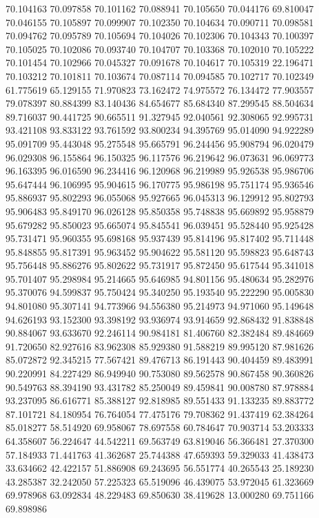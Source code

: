 70.104163
70.097858
70.101162
70.088941
70.105650
70.044176
69.810047
70.046155
70.105897
70.099907
70.102350
70.104634
70.090711
70.098581
70.094762
70.095789
70.105694
70.104026
70.102306
70.104343
70.100397
70.105025
70.102086
70.093740
70.104707
70.103368
70.102010
70.105222
70.101454
70.102966
70.045327
70.091678
70.104617
70.105319
22.196471
70.103212
70.101811
70.103674
70.087114
70.094585
70.102717
70.102349
61.775619
65.129155
71.970823
73.162472
74.975572
76.134472
77.903557
79.078397
80.884399
83.140436
84.654677
85.684340
87.299545
88.504634
89.716037
90.441725
90.665511
91.327945
92.040561
92.308065
92.995731
93.421108
93.833122
93.761592
93.800234
94.395769
95.014090
94.922289
95.091709
95.443048
95.275548
95.665791
96.244456
95.908794
96.020479
96.029308
96.155864
96.150325
96.117576
96.219642
96.073631
96.069773
96.163395
96.016590
96.234416
96.120968
96.219989
95.926538
95.986706
95.647444
96.106995
95.904615
96.170775
95.986198
95.751174
95.936546
95.886937
95.802293
96.055068
95.927665
96.045313
96.129912
95.802793
95.906483
95.849170
96.026128
95.850358
95.748838
95.669892
95.958879
95.679282
95.850023
95.665074
95.845541
96.039451
95.528440
95.925428
95.731471
95.960355
95.698168
95.937439
95.814196
95.817402
95.711448
95.848855
95.817391
95.963452
95.904622
95.581120
95.598823
95.648743
95.756448
95.886276
95.802622
95.731917
95.872450
95.617544
95.341018
95.701407
95.298984
95.214665
95.646985
94.801156
95.480634
95.282976
95.370076
94.599837
95.750424
95.340250
95.193540
95.222290
95.005830
94.801080
95.307141
94.773966
94.556380
95.214973
94.971060
95.149648
94.626193
93.152300
93.398192
93.936974
93.914659
92.868432
91.838848
90.884067
93.633670
92.246114
90.984181
81.406760
82.382484
89.484669
91.720650
82.927616
83.962308
85.929380
91.588219
89.995120
87.981626
85.072872
92.345215
77.567421
89.476713
86.191443
90.404459
89.483991
90.220991
84.227429
86.949940
90.753080
89.562578
90.867458
90.360826
90.549763
88.394190
93.431782
85.250049
89.459841
90.008780
87.978884
93.237095
86.616771
85.388127
92.818985
89.551433
91.133235
89.883772
87.101721
84.180954
76.764054
77.475176
79.708362
91.437419
62.384264
85.018277
58.514920
69.958067
78.697558
60.784647
70.903714
53.203333
64.358607
56.224647
44.542211
69.563749
63.819046
56.366481
27.370300
57.184933
71.441763
41.362687
25.744388
47.659393
59.329033
41.438473
33.634662
42.422157
51.886908
69.243695
56.551774
40.265543
25.189230
43.285387
32.242050
57.225323
65.519096
46.439075
53.972045
61.323669
69.978968
63.092834
48.229483
69.850630
38.419628
13.000280
69.751166
69.898986

